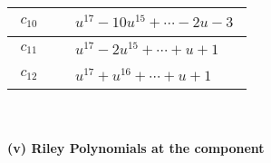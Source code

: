 \documentclass[1p]{elsarticle_modified}
\theoremstyle{definition}
\begin{document}
\begin{tabular}{m{50pt}|m{274pt}}
\hline $$\begin{aligned}c_{10}\end{aligned}$$&$\begin{aligned}
&u^{17}-10 u^{15}+\cdots-2 u-3
\end{aligned}$\\
\hline $$\begin{aligned}c_{11}\end{aligned}$$&$\begin{aligned}
&u^{17}-2 u^{15}+\cdots+u+1
\end{aligned}$\\
\hline $$\begin{aligned}c_{12}\end{aligned}$$&$\begin{aligned}
&u^{17}+u^{16}+\cdots+u+1
\end{aligned}$\\
\hline
\end{tabular}\\~\\
\newpage\renewcommand{\arraystretch}{1}
\flushleft \textbf{(v) Riley Polynomials at the component}\newline \\
\end{document}
